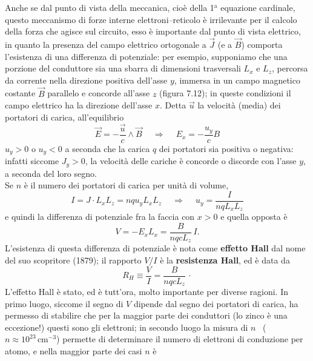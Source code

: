 Anche se dal punto di vista della meccanica, cio\`e della 1$^\mathrm{a}$
equazione cardinale, questo meccanismo di forze interne elettroni--reticolo \`e
irrilevante per il calcolo della forza che agisce sul circuito, esso \`e
importante dal punto di vista elettrico, in quanto la presenza del campo
elettrico ortogonale a $\vec J$ (e a $\vec B$) comporta l'esistenza di una
differenza di potenziale: per esempio, supponiamo che una porzione del
conduttore sia una sbarra di dimensioni trasversali $L_x$ e $L_z$, percorsa da
corrente nella direzione positiva dell'asse $y$, immersa in un campo magnetico
costante $\vec B$ parallelo e concorde all'asse $z$ (figura 7.12); in queste
condizioni il campo elettrico ha la direzione dell'asse $x$.
Detta $\vec u$ la velocit\`a (media) dei portatori di carica, all'equilibrio
\begin{equation}
  \vec E=-\frac{\vec u}{c}\wedge\vec B
  \quad\ \Rightarrow\quad\ E_x=-\frac{u_y}{c}B
  \tag{7.65}
\end{equation}
$u_y>0$ o $u_y<0$ a seconda che la carica $q$ dei portatori sia positiva o
negativa: infatti siccome $J_y>0$, la velocit\`a delle cariche \`e concorde o
discorde con l'asse $y$, a seconda del loro segno.\\
Se $n$ \`e il numero dei portatori di carica per unit\`a di volume,
\begin{equation}
  I=J\cdot L_xL_z=nqu_yL_xL_z\quad\ \Rightarrow\quad\ u_y=\frac{I}{nqL_xL_z}
  \tag{7.66}
\end{equation}
e quindi la differenza di potenziale fra la faccia con $x>0$ e quella opposta
\`e
\begin{equation}
  V=-E_xL_x=\frac{B}{nqcL_z}\,I.
  \tag{7.67}
\end{equation}
L'esistenza di questa differenza di potenziale \`e nota come \textbf{effetto
Hall} dal nome del suo scopritore (1879); il rapporto $V/I$ \`e la
\textbf{resistenza Hall}, ed \`e data da
\begin{equation}
  R_H\equiv\frac{V}{I}=\frac{B}{nqcL_z}\,\cdot
  \tag{7.68}
\end{equation}
L'effetto Hall \`e stato, ed \`e tutt'ora, molto importante per diverse ragioni.
In primo luogo, siccome il segno di $V$ dipende dal segno dei portatori di
carica, ha permesso di stabilire che per la maggior parte dei conduttori (lo
zinco \`e una eccezione!) questi sono gli elettroni; in secondo luogo la misura
di $n$ \ ($n\approx10^{23}\,\mathrm{cm}^{-3}$) permette di determinare il numero
di elettroni di conduzione per atomo, e nella maggior parte dei casi $n$ \`e
